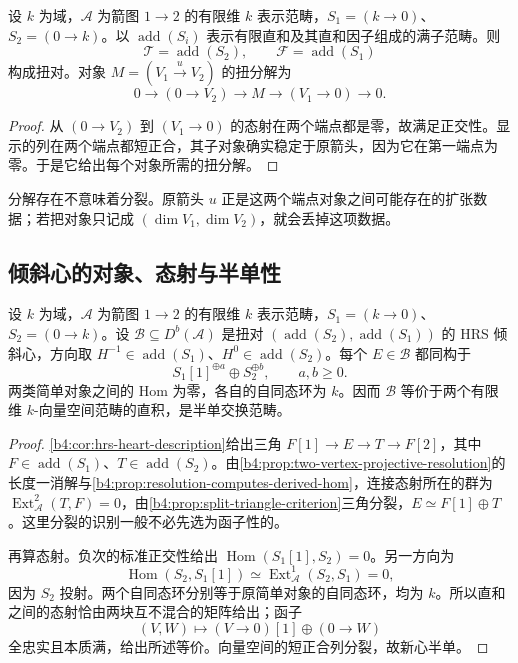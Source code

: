 \begin{proposition}\label{b4:prop:two-vertex-torsion-pair}
设 \(k\) 为域，\(\mathcal A\) 为箭图 \(1\to2\) 的有限维 \(k\) 表示范畴，\(S_1=(k\to0)\)、\(S_2=(0\to k)\)。以 \(\operatorname{add}(S_i)\) 表示有限直和及其直和因子组成的满子范畴。则
\[
 \mathcal T=\operatorname{add}(S_2),\qquad
 \mathcal F=\operatorname{add}(S_1)
\]
构成扭对。对象 \(M=(V_1\xrightarrow{u}V_2)\) 的扭分解为
\[
 0\longrightarrow(0\to V_2)\longrightarrow M
 \longrightarrow(V_1\to0)\longrightarrow0.
\]
\end{proposition}
\begin{proof}
从 \((0\to V_2)\) 到 \((V_1\to0)\) 的态射在两个端点都是零，故满足正交性。显示的列在两个端点都短正合，其子对象确实稳定于原箭头，因为它在第一端点为零。于是它给出每个对象所需的扭分解。
\end{proof}

分解存在不意味着分裂。原箭头 \(u\) 正是这两个端点对象之间可能存在的扩张数据；若把对象只记成 \((\dim V_1,\dim V_2)\)，就会丢掉这项数据。

\subsection{倾斜心的对象、态射与半单性}
\label{b4:subsec:1905:03}

\begin{theorem}\label{b4:thm:two-vertex-tilted-heart}
设 \(k\) 为域，\(\mathcal A\) 为箭图 \(1\to2\) 的有限维 \(k\) 表示范畴，\(S_1=(k\to0)\)、\(S_2=(0\to k)\)。设 \(\mathcal B\subseteq D^b(\mathcal A)\) 是扭对 \((\operatorname{add}(S_2),\operatorname{add}(S_1))\) 的 HRS 倾斜心，方向取 \(H^{-1}\in\operatorname{add}(S_1)\)、\(H^0\in\operatorname{add}(S_2)\)。每个 \(E\in\mathcal B\) 都同构于
\[
 S_1[1]^{\oplus a}\oplus S_2^{\oplus b},\qquad a,b\ge0.
\]
两类简单对象之间的 Hom 为零，各自的自同态环为 \(k\)。因而 \(\mathcal B\) 等价于两个有限维 \(k\)-向量空间范畴的直积，是半单交换范畴。
\end{theorem}
\begin{proof}
\cref{b4:cor:hrs-heart-description}给出三角 \(F[1]\to E\to T\to F[2]\)，其中 \(F\in\operatorname{add}(S_1)\)、\(T\in\operatorname{add}(S_2)\)。由\cref{b4:prop:two-vertex-projective-resolution}的长度一消解与\cref{b4:prop:resolution-computes-derived-hom}，连接态射所在的群为 \(\operatorname{Ext}_{\mathcal A}^2(T,F)=0\)，由\cref{b4:prop:split-triangle-criterion}三角分裂，\(E\simeq F[1]\oplus T\)。这里分裂的识别一般不必先选为函子性的。

再算态射。负次的标准正交性给出 \(\operatorname{Hom}(S_1[1],S_2)=0\)。另一方向为
\[
 \operatorname{Hom}(S_2,S_1[1])\simeq\operatorname{Ext}_{\mathcal A}^1(S_2,S_1)=0,
\]
因为 \(S_2\) 投射。两个自同态环分别等于原简单对象的自同态环，均为 \(k\)。所以直和之间的态射恰由两块互不混合的矩阵给出；函子
\[
 (V,W)\longmapsto(V\to0)[1]\oplus(0\to W)
\]
全忠实且本质满，给出所述等价。向量空间的短正合列分裂，故新心半单。
\end{proof}

